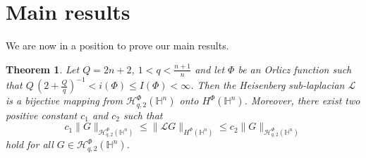 \documentclass[oneside,10pt]{article}
\newtheorem{theorem}{Theorem}
\begin{document}
\section{Main results} \label{main thm}

We are now in a position to prove our main results.

\begin{theorem} \label{principal thm} Let $Q=2n+2$, $1 < q < \frac{n+1}{n}$ and let $\Phi$ be an Orlicz function such that 
$Q \, (2 + \frac{Q}{q})^{-1} < i(\Phi) \leq I(\Phi) < \infty$. Then the Heisenberg 
sub-laplacian $\mathcal{L}$ is a bijective mapping from $\mathcal{H}^{\Phi}_{q, 2}(\mathbb{H}^{n})$ onto $H^{\Phi}(\mathbb{H}^{n})$. 
Moreover, there exist two positive constant $c_1$ and $c_2$ such that
\begin{equation} \label{doble ineq}
c_1 \|G \|_{\mathcal{H}^{\Phi}_{q, 2}(\mathbb{H}^{n})} \leq \| \mathcal{L}G \|_{H^{\Phi}(\mathbb{H}^{n})} \leq 
c_2 \|G \|_{\mathcal{H}^{\Phi}_{q, 2}(\mathbb{H}^{n})}
\end{equation}
hold for all $G \in \mathcal{H}^{\Phi}_{q, 2}(\mathbb{H}^{n})$.
\end{theorem}
\end{document}
